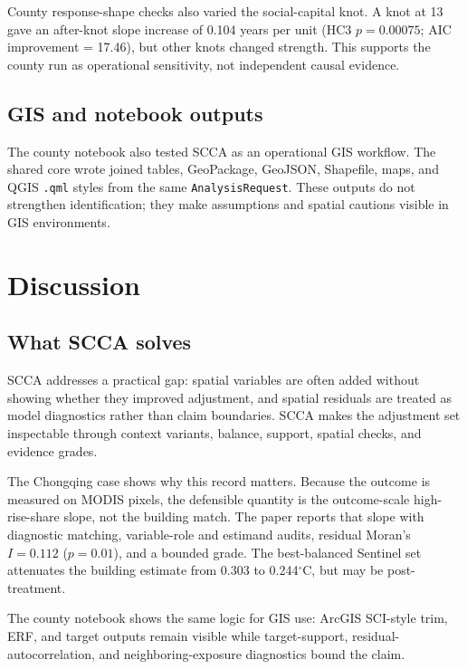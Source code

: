\documentclass{article}
\begin{document}
County response-shape checks also varied the social-capital knot. A knot at 13 gave an after-knot slope increase of 0.104 years per unit (HC3 $p=0.00075$; AIC improvement = 17.46), but other knots changed strength. This supports the county run as operational sensitivity, not independent causal evidence.

\subsection{GIS and notebook outputs}

The county notebook also tested SCCA as an operational GIS workflow. The shared core wrote joined tables, GeoPackage, GeoJSON, Shapefile, maps, and QGIS \texttt{.qml} styles from the same \texttt{AnalysisRequest}. These outputs do not strengthen identification; they make assumptions and spatial cautions visible in GIS environments.

\section{Discussion}
\label{sec:discussion}

\subsection{What SCCA solves}

SCCA addresses a practical gap: spatial variables are often added without showing whether they improved adjustment, and spatial residuals are treated as model diagnostics rather than claim boundaries. SCCA makes the adjustment set inspectable through context variants, balance, support, spatial checks, and evidence grades.

The Chongqing case shows why this record matters. Because the outcome is measured on MODIS pixels, the defensible quantity is the outcome-scale high-rise-share slope, not the building match. The paper reports that slope with diagnostic matching, variable-role and estimand audits, residual Moran's $I = 0.112$ ($p = 0.01$), and a bounded grade. The best-balanced Sentinel set attenuates the building estimate from 0.303 to 0.244$^\circ$C, but may be post-treatment.

The county notebook shows the same logic for GIS use: ArcGIS SCI-style trim, ERF, and target outputs remain visible while target-support, residual-autocorrelation, and neighboring-exposure diagnostics bound the claim.
\end{document}
